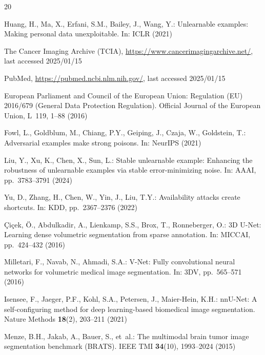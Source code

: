 \documentclass[runningheads]{llncs}
\begin{document}
%
%

\begin{thebibliography}{20}

Huang, H., Ma, X., Erfani, S.M., Bailey, J., Wang, Y.:
Unlearnable examples: Making personal data unexploitable.
In: ICLR (2021)

The Cancer Imaging Archive (TCIA),
\url{https://www.cancerimagingarchive.net/}, last accessed 2025/01/15

PubMed, \url{https://pubmed.ncbi.nlm.nih.gov/}, last accessed 2025/01/15


{European Parliament and Council of the European Union}:
Regulation ({EU}) 2016/679 (General Data Protection Regulation).
Official Journal of the European Union, L~119, 1--88 (2016)

Fowl, L., Goldblum, M., Chiang, P.Y., Geiping, J., Czaja, W., Goldstein, T.:
Adversarial examples make strong poisons.
In: NeurIPS (2021)

Liu, Y., Xu, K., Chen, X., Sun, L.:
Stable unlearnable example: Enhancing the robustness of unlearnable examples via stable error-minimizing noise.
In: AAAI, pp.~3783--3791 (2024)

Yu, D., Zhang, H., Chen, W., Yin, J., Liu, T.Y.:
Availability attacks create shortcuts.
In: KDD, pp.~2367--2376 (2022)


\c{C}i\c{c}ek, \"O., Abdulkadir, A., Lienkamp, S.S., Brox, T., Ronneberger, O.:
3D U-Net: Learning dense volumetric segmentation from sparse annotation.
In: MICCAI, pp.~424--432 (2016)

Milletari, F., Navab, N., Ahmadi, S.A.:
V-Net: Fully convolutional neural networks for volumetric medical image segmentation.
In: 3DV, pp.~565--571 (2016)

Isensee, F., Jaeger, P.F., Kohl, S.A., Petersen, J., Maier-Hein, K.H.:
nnU-Net: A self-configuring method for deep learning-based biomedical image segmentation.
Nature Methods \textbf{18}(2), 203--211 (2021)

Menze, B.H., Jakab, A., Bauer, S., et~al.:
The multimodal brain tumor image segmentation benchmark (BRATS).
IEEE TMI \textbf{34}(10), 1993--2024 (2015)


\end{thebibliography}
\end{document}
